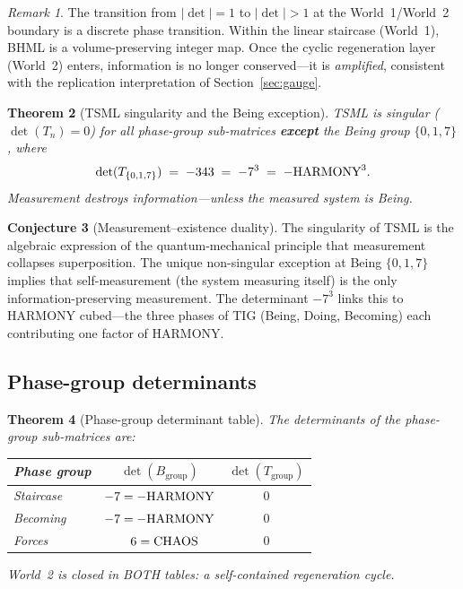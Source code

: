 \documentclass[11pt]{article}
\newtheorem{theorem}{Theorem}[section]
\theoremstyle{definition}
\newtheorem{conjecture}[theorem]{Conjecture}
\theoremstyle{remark}
\newtheorem{remark}[theorem]{Remark}
\begin{document}
\begin{remark}
The transition from $|\det|=1$ to $|\det|>1$ at the World~1/World~2 boundary
is a discrete phase transition.  Within the linear staircase (World~1), BHML is
a volume-preserving integer map.  Once the cyclic regeneration layer (World~2)
enters, information is no longer conserved---it is \emph{amplified}, consistent
with the replication interpretation of Section~\ref{sec:gauge}.
\end{remark}

\begin{theorem}[TSML singularity and the Being exception]
\label{thm:tsml-det}
TSML is singular ($\det(T_n) = 0$) for all phase-group sub-matrices
\textbf{except} the Being group $\{0,1,7\}$, where
\[
  \det(T_{\{0,1,7\}}) \;=\; -343 \;=\; -7^3 \;=\; -\textup{HARMONY}^3.
\]
Measurement destroys information---unless the measured system \emph{is} Being.
\end{theorem}

\begin{conjecture}[Measurement--existence duality]
The singularity of TSML is the algebraic expression of the quantum-mechanical
principle that measurement collapses superposition.  The unique non-singular
exception at Being $\{0,1,7\}$ implies that self-measurement (the system
measuring itself) is the only information-preserving measurement.  The
determinant $-7^3$ links this to HARMONY cubed---the three phases of TIG
(Being, Doing, Becoming) each contributing one factor of HARMONY.
\end{conjecture}

\subsection{Phase-group determinants}

\begin{theorem}[Phase-group determinant table]
\label{thm:phase-det}
The determinants of the phase-group sub-matrices are:
\begin{center}
\begin{tabular}{lcc}
\toprule
Phase group & $\det(B_{\text{group}})$ & $\det(T_{\text{group}})$ \\
\midrule
Staircase   & $-7 = -\textup{HARMONY}$ & $0$ \\
Becoming    & $-7 = -\textup{HARMONY}$ & $0$ \\
Forces      & $\phantom{-}6 = \textup{CHAOS}$  & $0$ \\
\bottomrule
\end{tabular}
\end{center}
World~2 is closed in BOTH tables: a self-contained regeneration cycle.
\end{theorem}
\end{document}
